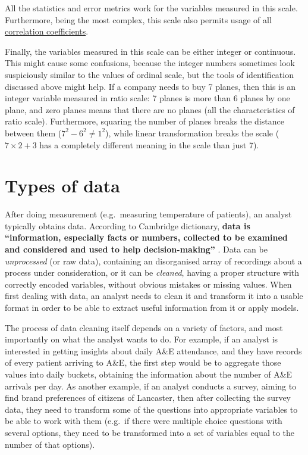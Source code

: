 \documentclass[
]{book}
\theoremstyle{definition}
\theoremstyle{definition}
\theoremstyle{definition}
\theoremstyle{definition}
\theoremstyle{remark}
\begin{document}
All the statistics and error metrics work for the variables measured in this scale. Furthermore, being the most complex, this scale also permits usage of all \hyperref[correlations]{correlation coefficients}.

Finally, the variables measured in this scale can be either integer or continuous. This might cause some confusions, because the integer numbers sometimes look suspiciously similar to the values of ordinal scale, but the tools of identification discussed above might help. If a company needs to buy 7 planes, then this is an integer variable measured in ratio scale: 7 planes is more than 6 planes by one plane, and zero planes means that there are no planes (all the characteristics of ratio scale). Furthermore, squaring the number of planes breaks the distance between them (\(7^2 - 6^2 \neq 1^2\)), while linear transformation breaks the scale (\(7\times 2 + 3\) has a completely different meaning in the scale than just 7).

\section{Types of data}\label{typesOfData}

After doing measurement (e.g.~measuring temperature of patients), an analyst typically obtains data. According to Cambridge dictionary, \textbf{data is ``information, especially facts or numbers, collected to be examined and considered and used to help decision-making''} \citep{CambridgeData}. Data can be \emph{unprocessed} (or raw data), containing an disorganised array of recordings about a process under consideration, or it can be \emph{cleaned}, having a proper structure with correctly encoded variables, without obvious mistakes or missing values. When first dealing with data, an analyst needs to clean it and transform it into a usable format in order to be able to extract useful information from it or apply models.

The process of data cleaning itself depends on a variety of factors, and most importantly on what the analyst wants to do. For example, if an analyst is interested in getting insights about daily A\&E attendance, and they have records of every patient arriving to A\&E, the first step would be to aggregate those values into daily buckets, obtaining the information about the number of A\&E arrivals per day. As another example, if an analyst conducts a survey, aiming to find brand preferences of citizens of Lancaster, then after collecting the survey data, they need to transform some of the questions into appropriate variables to be able to work with them (e.g.~if there were multiple choice questions with several options, they need to be transformed into a set of variables equal to the number of that options).
\end{document}
